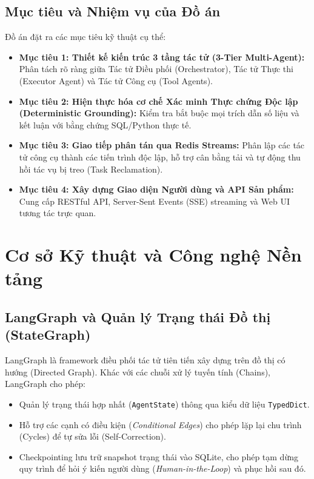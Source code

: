 \documentclass[12pt, a4paper]{article}
\begin{document}
\subsection{Mục tiêu và Nhiệm vụ của Đồ án}
Đồ án đặt ra các mục tiêu kỹ thuật cụ thể:
\begin{itemize}[leftmargin=1.5cm]
    \item \textbf{Mục tiêu 1: Thiết kế kiến trúc 3 tầng tác tử (3-Tier Multi-Agent):} Phân tách rõ ràng giữa Tác tử Điều phối (Orchestrator), Tác tử Thực thi (Executor Agent) và Tác tử Công cụ (Tool Agents).
    \item \textbf{Mục tiêu 2: Hiện thực hóa cơ chế Xác minh Thực chứng Độc lập (Deterministic Grounding):} Kiểm tra bắt buộc mọi trích dẫn số liệu và kết luận với bằng chứng SQL/Python thực tế.
    \item \textbf{Mục tiêu 3: Giao tiếp phân tán qua Redis Streams:} Phân lập các tác tử công cụ thành các tiến trình độc lập, hỗ trợ cân bằng tải và tự động thu hồi tác vụ bị treo (Task Reclamation).
    \item \textbf{Mục tiêu 4: Xây dựng Giao diện Người dùng và API Sản phẩm:} Cung cấp RESTful API, Server-Sent Events (SSE) streaming và Web UI tương tác trực quan.
\end{itemize}

\section{Cơ sở Kỹ thuật và Công nghệ Nền tảng}

\subsection{LangGraph và Quản lý Trạng thái Đồ thị (StateGraph)}
LangGraph là framework điều phối tác tử tiên tiến xây dựng trên đồ thị có hướng (Directed Graph). Khác với các chuỗi xử lý tuyến tính (Chains), LangGraph cho phép:
\begin{itemize}
    \item Quản lý trạng thái hợp nhất (\texttt{AgentState}) thông qua kiểu dữ liệu \texttt{TypedDict}.
    \item Hỗ trợ các cạnh có điều kiện (\textit{Conditional Edges}) cho phép lặp lại chu trình (Cycles) để tự sửa lỗi (Self-Correction).
    \item Checkpointing lưu trữ snapshot trạng thái vào SQLite, cho phép tạm dừng quy trình để hỏi ý kiến người dùng (\textit{Human-in-the-Loop}) và phục hồi sau đó.
\end{itemize}
\end{document}
